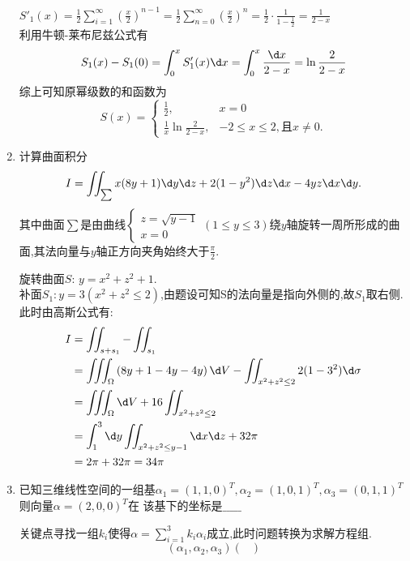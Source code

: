 \documentclass[12pt, a4paper, oneside, UTF8]{ctexbook}
\begin{document}
\begin{enumerate}
\begin{solution}
        $S'_1(x)=\frac{1}{2}\sum_{i=1}^{\infty}\left(\frac{x}{2}\right)^{n-1}=\frac{1}{2}\sum_{n=0}^{\infty}\left(\frac{x}{2}\right)^n=\frac{1}{2}\cdot\frac{1}{1-\frac{1}{2}}=\frac{1}{2-x}$ \\
        利用牛顿-莱布尼兹公式有
        $$
        S_1(x)-S_1(0) = \int_{0}^{x}S'_1(x)\d x = \int_{0}^{x}\frac{\d x}{2 - x} = \ln\frac{2}{2-x}
        $$
        综上可知原幂级数的和函数为
        $$
        S(x) = \begin{cases}
            \frac{1}{2}, &x=0 \\
            \frac{1}{x}\ln{\frac{2}{2-x}}, & -2\leq x\leq 2,\text{且}x\neq 0.
        \end{cases}
        $$
    \end{solution}
    \item 计算曲面积分
    $$
    I = \iint_{\sum}x(8y+1)\d y\d z + 2(1-y^2)\d z\d x - 4yz\d x\d y. 
    $$
    其中曲面$\sum$是由曲线$\begin{cases}
        z = \sqrt{y-1} \\
        x = 0
    \end{cases}(1\leq y\leq 3)$绕$y$轴旋转一周所形成的曲面,其法向量与$y$轴正方向夹角始终大于$\frac{\pi}{2}$. 
    \begin{solution}
        旋转曲面$S$: $y=x^2+z^2+1$. \\
        补面$S_1:y=3(x^2+z^2 \leq 2)$,由题设可知S的法向量是指向外侧的,故$S_1$取右侧. 此时由高斯公式有:
        \begin{align*}
            I &= \iint_{s+s_1} - \iint_{s_1} \\
            &= \iiint_{\Omega}\left(8y+1-4y-4y\right)\d V - \iint_{x^2+z^2\leq 2}2(1-3^2)\d\sigma \\
            &= \iiint_{\Omega}\d V + 16 \iint_{x^2+z^2 \leq 2}  \\
            &= \int_{1}^{3}\d y \iint_{x^2+z^2\leq y - 1}\d x\d z + 32\pi \\
            &= 2\pi + 32\pi = 34\pi
        \end{align*}
    \end{solution}
    \item 已知三维线性空间的一组基$\alpha_1=(1,1,0)^T,\alpha_2=(1,0,1)^T,\alpha_3=(0,1,1)^T$则向量$\alpha=(2,0,0)^T$在
    该基下的坐标是$\_\_\_\_\_$
    \begin{solution}
        关键点寻找一组$k_i$使得$\alpha = \sum_{i=1}^{3}k_i\alpha_i$成立,此时问题转换为求解方程组. 
        $$
        (\alpha_1,\alpha_2,\alpha_3)\begin{pmatrix}

\end{pmatrix}$$
\end{solution}
\end{enumerate}
\end{document}
